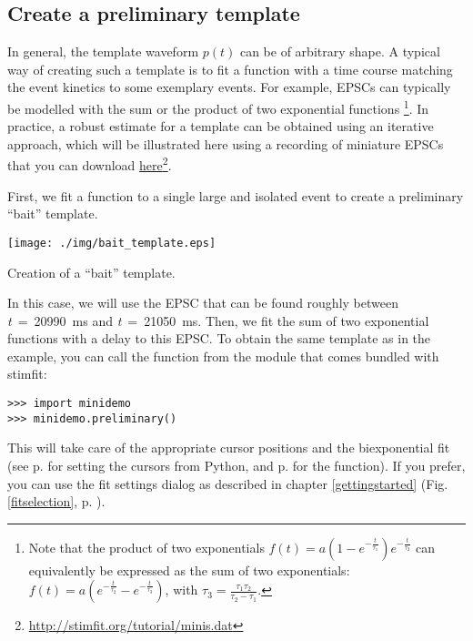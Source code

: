 \subsection{Create a preliminary template}
In general, the template waveform $p(t)$ can be of arbitrary shape. A typical way of creating such a template is to fit a function with a time course matching the event kinetics to some exemplary events. For example, EPSCs can typically be modelled with the sum or the product of two exponential functions \footnote{Note that the product of two exponentials $f(t)=a\left(1-e^{-\frac{t}{\tau_1}}\right)e^{-\frac{t}{\tau_2}}$ can equivalently be expressed as the sum of two exponentials: $f(t)=a\left(e^{-\frac{t}{\tau_2}}-e^{-\frac{t}{\tau_3}}\right)$, with $\tau_3=\frac{\tau_1\tau_2}{\tau_2-\tau_1}$.}. In practice, a robust estimate for a template can be obtained using an iterative approach, which will be illustrated here using a recording of miniature EPSCs that you can download \href{http://stimfit.org/tutorial/minis.dat}{here}\footnote{\url{http://stimfit.org/tutorial/minis.dat}}.

\label{bait}First, we fit a function to a single large and isolated event to create a preliminary ``bait'' template.
  \begin{myfigure}[htb]
    \begin{center}
      \texttt{[image: ./img/bait\_template.eps]}
    \end{center}
    \caption{Creation of a ``bait'' template.}
    \label{baittemplate}
  \end{myfigure}
In this case, we will use the EPSC that can be found roughly between \textit{t}~=~20990~ms and \textit{t}~=~21050~ms. Then, we fit the sum of two exponential functions with a delay to this EPSC. To obtain the same template as in the example, you can call the function  from the  module that comes bundled with stimfit:
\begin{lstlisting}
>>> import minidemo
>>> minidemo.preliminary()
\end{lstlisting}
This will take care of the appropriate cursor positions and the biexponential fit (see p. \pageref{setpeakstart} for setting the cursors from Python, and p. \pageref{leastsq} for the  function). If you prefer, you can use the fit settings dialog as described in chapter \ref{gettingstarted} (Fig. \ref{fitselection}, p. \pageref{fitselection}).

